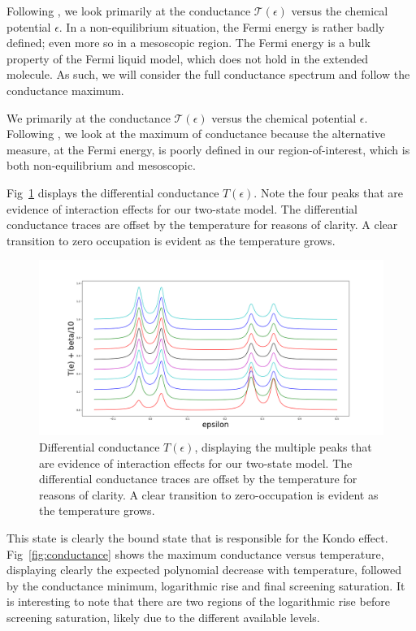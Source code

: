 \documentclass{article}
\begin{document}
\begin{multicols}{2}
        Following \citet{meir}, we look primarily at the conductance $\mathscr{T}(\epsilon)$ versus the chemical potential $\epsilon$. In a non-equilibrium situation, the Fermi energy is rather badly defined; even more so in a mesoscopic region. The Fermi energy is a bulk property of the Fermi liquid model, which does not hold in the extended molecule. As such, we will consider the full conductance spectrum and follow the conductance maximum.
        
        We primarily at the conductance $\mathscr{T}(\epsilon)$ versus the chemical potential $\epsilon$. Following \citet{meir}, we look at the maximum of conductance because the alternative measure, at the Fermi energy, is poorly defined in our region-of-interest, which is both non-equilibrium and mesoscopic. 
        
        Fig~\ref{fig:transplot} displays the differential conductance $T(\epsilon)$. Note the four peaks that are evidence of interaction effects for our two-state model. The differential conductance traces are offset by the temperature for reasons of clarity. A clear transition to zero occupation is evident as the temperature grows.
        
        \begin{figure}[b]
            \centering
            \includegraphics[width=\textwidth]{fig/figure_3.png}
            \caption{\label{fig:transplot} Differential conductance $T(\epsilon)$, displaying the multiple peaks that are evidence of interaction effects for our two-state model. The differential conductance traces are offset by the temperature for reasons of clarity. A clear transition to zero-occupation is evident as the temperature grows.}
        \end{figure}
        
        This state is clearly the bound state that is responsible for the Kondo effect. Fig~\ref{fig:conductance} shows the maximum conductance versus temperature, displaying clearly the expected polynomial decrease with temperature, followed by the conductance minimum, logarithmic rise and final screening saturation. It is interesting to note that there are two regions of the logarithmic rise before screening saturation, likely due to the different available levels.
        

\end{multicols}
\end{document}

